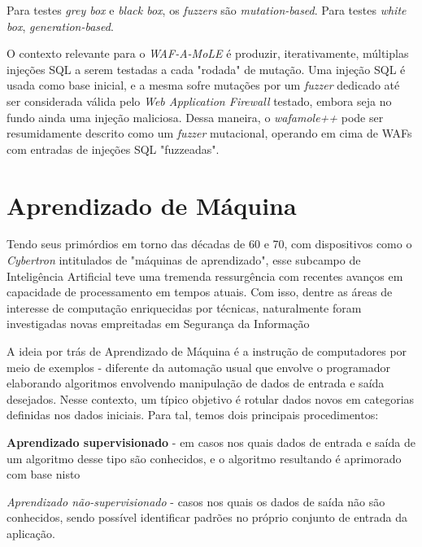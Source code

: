 Para testes \textit{grey box} e \textit{black box}, os \textit{fuzzers} são \textit{mutation-based}. Para testes \textit{white box}, \textit{generation-based}.

O contexto relevante para o \textit{WAF-A-MoLE} é produzir, iterativamente, múltiplas injeções SQL a serem testadas a cada "rodada" de mutação. Uma injeção SQL é usada como base inicial, e a mesma sofre mutações por um \textit{fuzzer} dedicado até ser considerada válida pelo \textit{Web Application Firewall} testado, embora seja no fundo ainda uma injeção maliciosa. Dessa maneira, o \textit{wafamole++} pode ser resumidamente descrito como um \textit{fuzzer} mutacional, operando em cima de WAFs com entradas de injeções SQL "fuzzeadas".

\section{Aprendizado de Máquina}

Tendo seus primórdios em torno das décadas de 60 e 70, com dispositivos como o \textit{Cybertron} intitulados de "máquinas de aprendizado", esse subcampo de Inteligência Artificial teve uma tremenda ressurgência com recentes avanços em capacidade de processamento em tempos atuais. Com isso, dentre as áreas de interesse de computação enriquecidas por técnicas, naturalmente foram investigadas novas empreitadas em Segurança da Informação

A ideia por trás de Aprendizado de Máquina \cite{dantas_transformers_2021} é a instrução de computadores por meio de exemplos - diferente da automação usual que envolve o programador elaborando algoritmos envolvendo manipulação de dados de entrada e saída desejados. Nesse contexto, um típico objetivo é rotular dados novos em categorias definidas nos dados iniciais. Para tal, temos dois principais procedimentos:
\begin{alineas}
\item \textbf{Aprendizado supervisionado} - em casos nos quais dados de entrada e saída de um algoritmo desse tipo são conhecidos, e o algoritmo resultando é aprimorado com base nisto
\item \textit{Aprendizado não-supervisionado} - casos nos quais os dados de saída não são conhecidos, sendo possível identificar padrões no próprio conjunto de entrada da aplicação.
\end{alineas}

